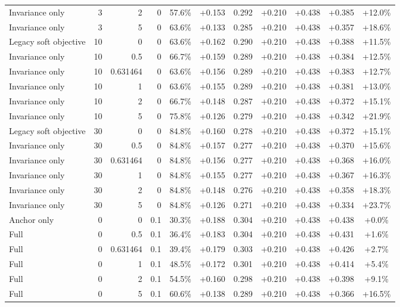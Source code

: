\begin{table}[htbp]
\begin{tabular}{lrrrccccccc}
Invariance only & 3 & 2 & 0 & 57.6\% & +0.153 & 0.292 & +0.210 & +0.438 & +0.385 & +12.0\% \\
Invariance only & 3 & 5 & 0 & 63.6\% & +0.133 & 0.285 & +0.210 & +0.438 & +0.357 & +18.6\% \\
Legacy soft objective & 10 & 0 & 0 & 63.6\% & +0.162 & 0.290 & +0.210 & +0.438 & +0.388 & +11.5\% \\
Invariance only & 10 & 0.5 & 0 & 66.7\% & +0.159 & 0.289 & +0.210 & +0.438 & +0.384 & +12.5\% \\
Invariance only & 10 & 0.631464 & 0 & 63.6\% & +0.156 & 0.289 & +0.210 & +0.438 & +0.383 & +12.7\% \\
Invariance only & 10 & 1 & 0 & 63.6\% & +0.155 & 0.289 & +0.210 & +0.438 & +0.381 & +13.0\% \\
Invariance only & 10 & 2 & 0 & 66.7\% & +0.148 & 0.287 & +0.210 & +0.438 & +0.372 & +15.1\% \\
Invariance only & 10 & 5 & 0 & 75.8\% & +0.126 & 0.279 & +0.210 & +0.438 & +0.342 & +21.9\% \\
Legacy soft objective & 30 & 0 & 0 & 84.8\% & +0.160 & 0.278 & +0.210 & +0.438 & +0.372 & +15.1\% \\
Invariance only & 30 & 0.5 & 0 & 84.8\% & +0.157 & 0.277 & +0.210 & +0.438 & +0.370 & +15.6\% \\
Invariance only & 30 & 0.631464 & 0 & 84.8\% & +0.156 & 0.277 & +0.210 & +0.438 & +0.368 & +16.0\% \\
Invariance only & 30 & 1 & 0 & 84.8\% & +0.155 & 0.277 & +0.210 & +0.438 & +0.367 & +16.3\% \\
Invariance only & 30 & 2 & 0 & 84.8\% & +0.148 & 0.276 & +0.210 & +0.438 & +0.358 & +18.3\% \\
Invariance only & 30 & 5 & 0 & 84.8\% & +0.126 & 0.271 & +0.210 & +0.438 & +0.334 & +23.7\% \\
Anchor only & 0 & 0 & 0.1 & 30.3\% & +0.188 & 0.304 & +0.210 & +0.438 & +0.438 & +0.0\% \\
Full & 0 & 0.5 & 0.1 & 36.4\% & +0.183 & 0.304 & +0.210 & +0.438 & +0.431 & +1.6\% \\
Full & 0 & 0.631464 & 0.1 & 39.4\% & +0.179 & 0.303 & +0.210 & +0.438 & +0.426 & +2.7\% \\
Full & 0 & 1 & 0.1 & 48.5\% & +0.172 & 0.301 & +0.210 & +0.438 & +0.414 & +5.4\% \\
Full & 0 & 2 & 0.1 & 54.5\% & +0.160 & 0.298 & +0.210 & +0.438 & +0.398 & +9.1\% \\
Full & 0 & 5 & 0.1 & 60.6\% & +0.138 & 0.289 & +0.210 & +0.438 & +0.366 & +16.5\% \\

\end{tabular}
\end{table}
